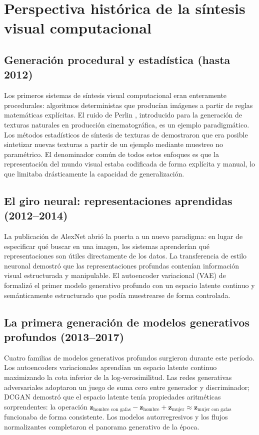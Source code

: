 \documentclass[12pt, a4paper, twoside]{book}
\newcommand{\z}{\mathbf{z}}
\begin{document}
\section{Perspectiva histórica de la síntesis visual computacional}
\label{sec:historia}

\subsection{Generación procedural y estadística (hasta 2012)}

Los primeros sistemas de síntesis visual computacional eran enteramente procedurales: algoritmos deterministas que producían imágenes a partir de reglas matemáticas explícitas. El ruido de Perlin \citep{perlin1985noise}, introducido para la generación de texturas naturales en producción cinematográfica, es un ejemplo paradigmático. Los métodos estadísticos de síntesis de texturas de \citet{efros1999texture} demostraron que era posible sintetizar nuevas texturas a partir de un ejemplo mediante muestreo no paramétrico. El denominador común de todos estos enfoques es que la representación del mundo visual estaba codificada de forma explícita y manual, lo que limitaba drásticamente la capacidad de generalización.

\subsection{El giro neural: representaciones aprendidas (2012--2014)}

La publicación de AlexNet \citep{krizhevsky2012alexnet} abrió la puerta a un nuevo paradigma: en lugar de especificar qué buscar en una imagen, los sistemas aprenderían qué representaciones son útiles directamente de los datos. La transferencia de estilo neuronal \citep{gatys2016style} demostró que las representaciones profundas contenían información visual estructurada y manipulable. El autoencoder variacional (VAE) de \citet{kingma2013vae} formalizó el primer modelo generativo profundo con un espacio latente continuo y semánticamente estructurado que podía muestrearse de forma controlada.

\subsection{La primera generación de modelos generativos profundos (2013--2017)}

Cuatro familias de modelos generativos profundos surgieron durante este período. Los autoencoders variacionales \citep{kingma2013vae} aprendían un espacio latente continuo maximizando la cota inferior de la log-verosimilitud. Las redes generativas adversariales \citep{goodfellow2014gans} adoptaron un juego de suma cero entre generador y discriminador; DCGAN \citep{radford2015dcgan} demostró que el espacio latente tenía propiedades aritméticas sorprendentes: la operación $\z_{\text{hombre con gafas}} - \z_{\text{hombre}} + \z_{\text{mujer}} \approx \z_{\text{mujer con gafas}}$ funcionaba de forma consistente. Los modelos autorregresivos \citep{vandeoord2016pixelrnn} y los flujos normalizantes \citep{dinh2017realnvp,kingma2018glow} completaron el panorama generativo de la época.
\end{document}
